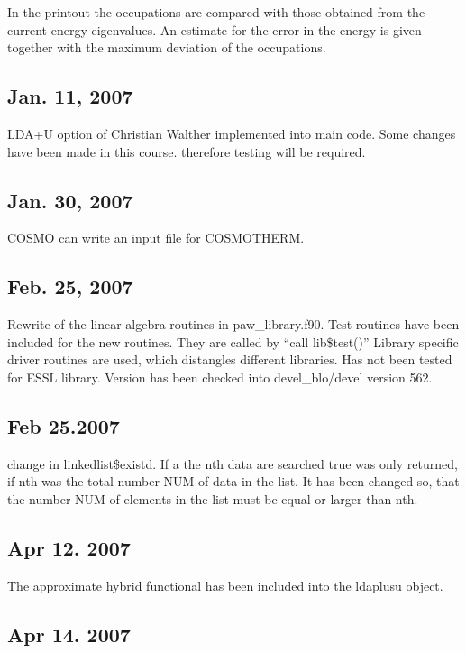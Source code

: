 \documentclass[final,12pt]{article}
\begin{document}
In the printout the occupations are compared with those obtained from the
current energy eigenvalues. An estimate for the error in the energy is given
together with the maximum deviation of the occupations. 

\subsection{Jan. 11, 2007}

LDA+U option of Christian Walther implemented into main code. Some changes
have been made in this course. therefore testing will be required.

\subsection{Jan. 30, 2007}

COSMO can write an input file for COSMOTHERM.

\subsection{Feb. 25, 2007}

Rewrite of the linear algebra routines in paw\_library.f90. Test routines have been 
included for the new routines. They are called by ``call lib\$test()''
Library specific driver routines are used, which distangles different libraries.
Has not been tested for ESSL library. Version has been checked into 
devel\_blo/devel version 562.

\subsection{Feb 25.2007}

change in linkedlist\$existd. If a the nth data are searched true was
only returned, if nth was the total number NUM of data in the list. It has
been changed so, that the number NUM of elements in the list must be equal
or larger than nth.

\subsection{Apr 12. 2007}

The approximate hybrid functional has been included into the ldaplusu object.

\subsection{Apr 14. 2007}
\end{document}
